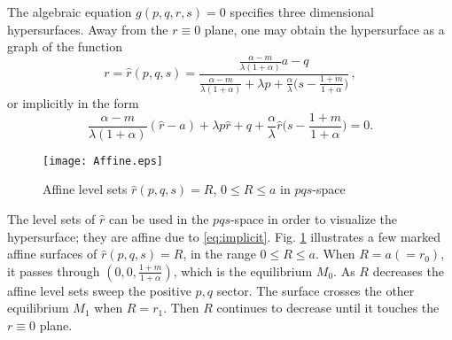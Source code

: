 \documentclass[usletter,11pt]{article}
\theoremstyle{remark}
\begin{document}
The algebraic equation $g(p,q,r,s)=0$ specifies three dimensional hypersurfaces. Away from the $r\equiv0$ plane, one may obtain the hypersurface as a graph of
the function
\begin{equation*}
r = \hat{r}(p,q,s) = \frac{ \frac{\alpha-m}{\lambda(1+\alpha)}a - q }{  \frac{\alpha-m}{\lambda(1+\alpha)} + \lambda p + \frac{\alpha}{\lambda}\big(s- \frac{1+m}{1+\alpha}\big)} \, ,
\end{equation*}
or implicitly in the form
\begin{equation}
\frac{\alpha-m}{\lambda(1+\alpha)}(\hat{r}-a) + \lambda p\hat{r} + q +\frac{\alpha}{\lambda}\hat{r}\big(s- \frac{1+m}{1+\alpha}\big)=0. \label{eq:implicit}
\end{equation}

\begin{figure}[ht]
 \centering
%
  \texttt{[image: Affine.eps]}
  \caption{Affine level sets $\hat{r}(p,q,s)=R$, $0\le R\le a$  in $pqs$-space} \label{fig:affine}
\end{figure}

The level sets of $\hat{r}$ can be used in the $pqs$-space in order to visualize the hypersurface; they are affine due to \eqref{eq:implicit}. 
Fig. \ref{fig:affine} illustrates a few marked affine surfaces of $\hat{r}(p,q,s)=R$, in the range $0\le R\le a$. When $R=a(=r_0)$, it passes through $\left(0,0,\tfrac{1+m}{1+\alpha}\right)$, which is the equilibrium $M_0$. As $R$ decreases the affine level sets sweep the positive $p,q$ sector. The surface crosses the other equilibrium $M_1$ when $R=r_1$. Then $R$ continues to decrease until it touches the $r\equiv0$ plane.
\end{document}
